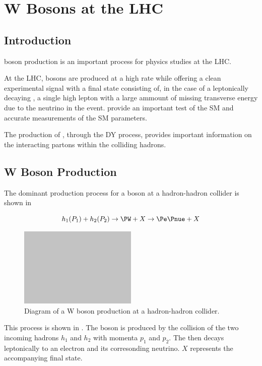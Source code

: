 \chapter{W Bosons at the LHC}

\section{Introduction}

\PW boson production is an important process for physics studies at the LHC.

At the \ac{LHC}, \PW bosons are produced at a high rate while offering a clean
experimental signal with a final state consisting of, in the case of a
leptonically decaying \PW, a single high \PT lepton with a large ammount of
missing transverse energy due to the neutrino in the event. \PW provide an
important test of the \ac{SM} and accurate measurements of the \ac{SM}
parameters. 

The production of \PW, through the \ac{DY} process, provides important
information on the interacting partons within the colliding hadrons.

\section{W Boson Production}

The dominant production process for a \PW boson at a hadron-hadron collider is
shown in 

\begin{equation}
  h_1(P_1) + h_2(P_2)
  \to 
  \PW + X
  \to
  \Pe \Pnue + X
  \label{wbos:wprod}
\end{equation}

\begin{figure}[htb]
  \centering
  \includegraphics[width=0.5\textwidth]{placeholder}
  \caption{Diagram of a W boson production at a hadron-hadron collider.}
  \label{wbos:wproddiag}
\end{figure}

This process is shown in . 
The \PW boson is produced by the collision of the two incoming hadrons $h_1$
and $h_2$ with momenta $p_1$ and $p_2$. The \PW then decays leptonically to an
electron and its corresonding neutrino. $X$ represents the accompanying final
state.

